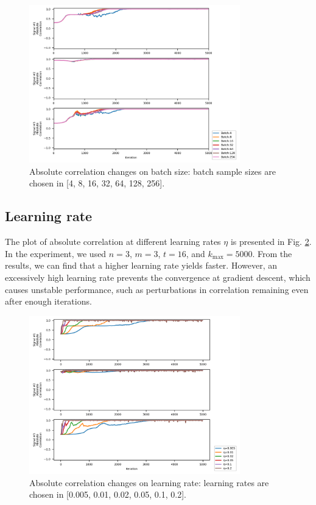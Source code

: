 \documentclass[conference]{IEEEtran}
\begin{document}
\begin{figure}[!t]
	\centering
	\includegraphics[width=3.6in]{batch_abs_test.png}	
	\caption{Absolute correlation changes on batch size: batch sample sizes are chosen in [4, 8, 16, 32, 64, 128, 256].}
	\label{fig:batch_abs_test}
\end{figure}


\subsection{Learning rate}

The plot of absolute correlation at different learning rates $\eta$ is presented in Fig. \ref{fig:eta_abs_test}.
In the experiment, we used $n=3$, $m=3$, $t=16$, and $k_{\text{max}} = 5000$.
From the results, we can find that a higher learning rate yields faster. However, an excessively high learning rate prevents the convergence at gradient descent, which causes unstable performance, such as perturbations in correlation remaining even after enough iterations.

\begin{figure}[!t]
	\centering
	\includegraphics[width=3.6in]{eta_abs_test.png}	
	\caption{Absolute correlation changes on learning rate: learning rates are chosen in [0.005, 0.01, 0.02, 0.05, 0.1, 0.2].}
	\label{fig:eta_abs_test}
\end{figure}
\end{document}
